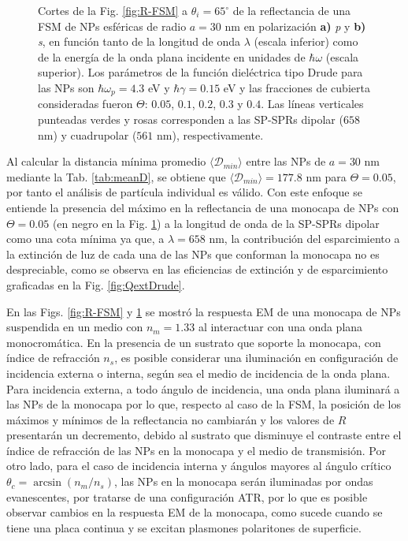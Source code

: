 \begin{figure}[h!]
	\caption{Cortes de la Fig. \ref{fig:R-FSM} a $\theta_i = 65^\circ$ de la reflectancia de una FSM de NPs esféricas de radio $a=30$ nm en polarización \textbf{a)} \emph{p} y \textbf{b)} \emph{s}, en función tanto de la longitud de onda $\lambda$ (escala inferior) como de la energía de la onda plana incidente en unidades de $\hbar\omega$ (escala superior). Los parámetros de la función dieléctrica tipo Drude para las NPs son $\hbar\omega_p = 4.3$ eV y $\hbar\gamma = 0.15$ eV y las fracciones de cubierta consideradas fueron $\Theta$: $0. 05$, $0. 1$, $0. 2$, $0. 3$ y $0. 4$. Las líneas verticales punteadas verdes y rosas corresponden a las SP-SPRs dipolar ($658$ nm) y cuadrupolar ($561$ nm), respectivamente.}\label{fig:FSM-Cuts}
	\end{figure}	

Al calcular la distancia mínima promedio $\langle\mathscr{D}_{min}\rangle$ entre las NPs  de $a = 30$ nm mediante la Tab. \ref{tab:meanD}, se obtiene que $\langle\mathscr{D}_{min}\rangle  = 177.8$ nm para $\Theta = 0.05$, por tanto el análisis de partícula individual es válido. Con este enfoque se entiende la presencia del máximo en la reflectancia de una monocapa  de NPs con $\Theta=0.05$ (en negro en la Fig. \ref{fig:FSM-Cuts}) a la longitud de onda de la SP-SPRs dipolar como una cota mínima ya que, a $\lambda=658$ nm, la contribución del esparcimiento a la extinción de luz de cada una de las NPs que conforman la monocapa no es despreciable, como se observa en las eficiencias de extinción y de esparcimiento graficadas en la Fig. \ref{fig:QextDrude}.

En las Figs. \ref{fig:R-FSM} y \ref{fig:FSM-Cuts} se mostró la respuesta EM de una monocapa de NPs suspendida en un medio con $n_m=1.33$ al interactuar con una onda plana monocromática. En la presencia de un sustrato que soporte la monocapa, con índice de refracción $n_s$, es posible considerar una iluminación en configuración de incidencia externa o interna, seg\'un sea el medio de incidencia de la onda plana. Para incidencia externa, a todo ángulo de incidencia,  una onda plana iluminará a las NPs de la monocapa por lo que, respecto al caso de la FSM, la posición de los máximos y mínimos de la reflectancia no cambiarán y los valores de $R$ presentarán un decremento, debido al sustrato que disminuye el contraste entre el índice de refracción de las NPs en la monocapa y el medio de transmisión. Por otro lado, para el caso de incidencia interna y ángulos mayores al ángulo crítico $\theta_c = \arcsin(n_m/n_s)$, las NPs en la monocapa serán iluminadas por ondas evanescentes, por tratarse de una configuración ATR, por lo que es posible  observar cambios en la respuesta EM de la monocapa, como sucede  cuando se tiene una placa continua y se excitan plasmones polaritones de superficie.

